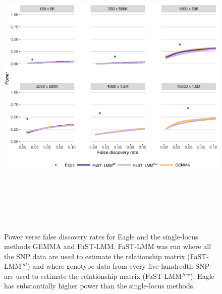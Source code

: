 \documentclass{article}
\begin{document}
\begin{figure}
\caption{Power verse false discovery rates for Eagle and the single-locus methods GEMMA and FaST-LMM. 
FaST-LMM was run where all the SNP data are used 
to estimate the relationship matrix (FaST-LMM$^{all}$)   and where genotype data from every five-hundredth SNP are used to 
estimate the relationship matrix (FaST-LMM$^{few}$). Eagle has substantially higher power than the single-locus methods.   }


\label{supfigpowersingle}
\begin{center}
\includegraphics[width=15cm, height=15cm]{power2main.eps}
\end{center}

\end{figure}
\end{document}
